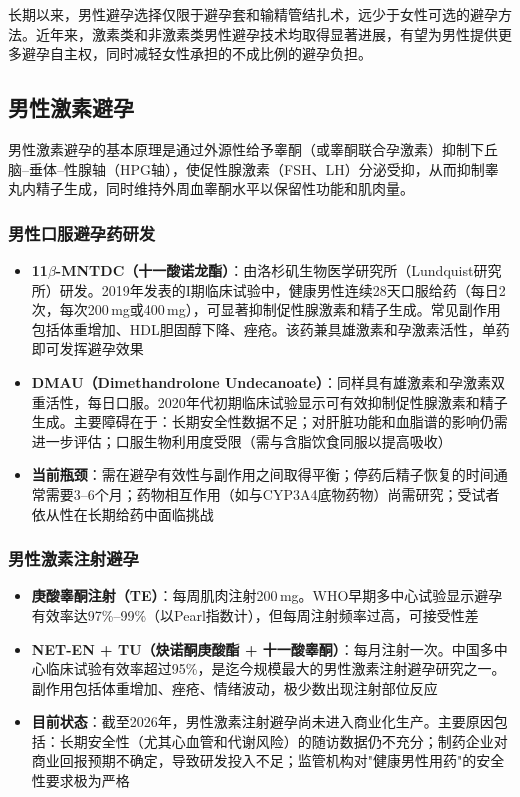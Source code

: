 长期以来，男性避孕选择仅限于避孕套和输精管结扎术，远少于女性可选的避孕方法。近年来，激素类和非激素类男性避孕技术均取得显著进展，有望为男性提供更多避孕自主权，同时减轻女性承担的不成比例的避孕负担。

\subsection{男性激素避孕}

男性激素避孕的基本原理是通过外源性给予睾酮（或睾酮联合孕激素）抑制下丘脑--垂体--性腺轴（HPG轴），使促性腺激素（FSH、LH）分泌受抑，从而抑制睾丸内精子生成，同时维持外周血睾酮水平以保留性功能和肌肉量。

\subsubsection{男性口服避孕药研发}

\begin{itemize}[leftmargin=2cm]
	\item \textbf{11$\beta$-MNTDC（十一酸诺龙酯）}：由洛杉矶生物医学研究所（Lundquist研究所）研发。2019年发表的I期临床试验中，健康男性连续28天口服给药（每日2次，每次200\,mg或400\,mg），可显著抑制促性腺激素和精子生成。常见副作用包括体重增加、HDL胆固醇下降、痤疮。该药兼具雄激素和孕激素活性，单药即可发挥避孕效果
	\item \textbf{DMAU（Dimethandrolone Undecanoate）}：同样具有雄激素和孕激素双重活性，每日口服。2020年代初期临床试验显示可有效抑制促性腺激素和精子生成。主要障碍在于：长期安全性数据不足；对肝脏功能和血脂谱的影响仍需进一步评估；口服生物利用度受限（需与含脂饮食同服以提高吸收）
	\item \textbf{当前瓶颈}：需在避孕有效性与副作用之间取得平衡；停药后精子恢复的时间通常需要3--6个月；药物相互作用（如与CYP3A4底物药物）尚需研究；受试者依从性在长期给药中面临挑战
\end{itemize}

\subsubsection{男性激素注射避孕}

\begin{itemize}[leftmargin=2cm]
	\item \textbf{庚酸睾酮注射（TE）}：每周肌肉注射200\,mg。WHO早期多中心试验显示避孕有效率达97\%--99\%（以Pearl指数计），但每周注射频率过高，可接受性差
	\item \textbf{NET-EN + TU（炔诺酮庚酸酯 + 十一酸睾酮）}：每月注射一次。中国多中心临床试验有效率超过95\%，是迄今规模最大的男性激素注射避孕研究之一。副作用包括体重增加、痤疮、情绪波动，极少数出现注射部位反应
	\item \textbf{目前状态}：截至2026年，男性激素注射避孕尚未进入商业化生产。主要原因包括：长期安全性（尤其心血管和代谢风险）的随访数据仍不充分；制药企业对商业回报预期不确定，导致研发投入不足；监管机构对"健康男性用药"的安全性要求极为严格
\end{itemize}

